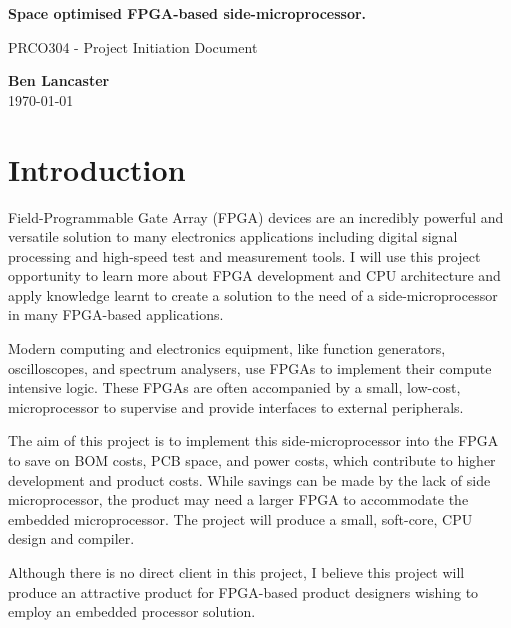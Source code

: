 \documentclass[11pt,a4paper]{article}
\begin{document}
\begin{titlepage}
\begin{center}

\vspace*{5cm}
\Large
\textbf{
Space optimised FPGA-based side-microprocessor.
}

\vspace{0.4cm}
\large
PRCO304 - Project Initiation Document

\vspace{4cm}
\textbf{Ben Lancaster}\\
\today 


\end{center}

\end{titlepage}

\renewcommand*\contentsname{Table of Contents}
\tableofcontents
\newpage

\section{Introduction}
Field-Programmable Gate Array (FPGA) devices are an incredibly powerful and versatile solution to many electronics applications including digital signal processing and high-speed test and measurement tools. I will use this project opportunity to learn more about FPGA development and CPU architecture and apply knowledge learnt to create a solution to the need of a side-microprocessor in many FPGA-based applications.

Modern computing and electronics equipment, like function generators, oscilloscopes, and spectrum analysers, use FPGAs to implement their compute intensive logic. These FPGAs are often accompanied by a small, low-cost, microprocessor to supervise and provide interfaces to external peripherals.

The aim of this project is to implement this side-microprocessor into the FPGA to save on BOM costs, PCB space, and power costs, which contribute to higher development and product costs. While savings can be made by the lack of side microprocessor, the product may need a larger FPGA to accommodate the embedded microprocessor. The project will produce a small, soft-core, CPU design and compiler.

Although there is no direct client in this project, I believe this project will produce an attractive product for FPGA-based product designers wishing to employ an embedded processor solution.
\end{document}
